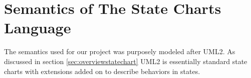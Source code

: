 \section{Semantics of The State Charts Language}

The semantics used for our project was purposely modeled after UML2. As discussed in section \ref{sec:overviewstatechart} UML2 is essentially standard state charts with extensions added on to describe behaviors in states. 